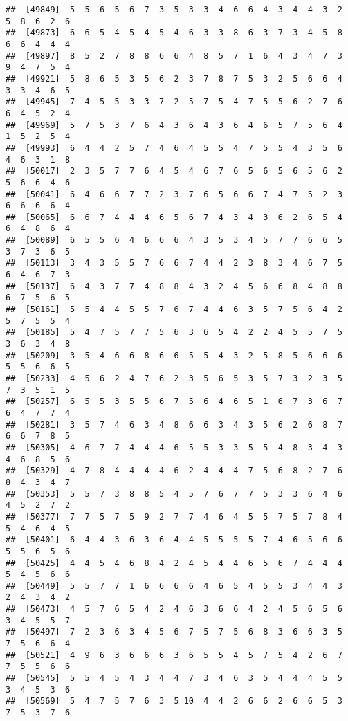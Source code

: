 \documentclass[
]{book}
\begin{document}
\begin{verbatim}
##  [49849]  5  5  6  5  6  7  3  5  3  3  4  6  6  4  3  4  4  3  2  5  8  6  2  6
##  [49873]  6  6  5  4  5  4  5  4  6  3  3  8  6  3  7  3  4  5  8  6  6  4  4  4
##  [49897]  8  5  2  7  8  8  6  6  4  8  5  7  1  6  4  3  4  7  3  9  4  7  5  4
##  [49921]  5  8  6  5  3  5  6  2  3  7  8  7  5  3  2  5  6  6  4  3  3  4  6  5
##  [49945]  7  4  5  5  3  3  7  2  5  7  5  4  7  5  5  6  2  7  6  6  4  5  2  4
##  [49969]  5  7  5  3  7  6  4  3  6  4  3  6  4  6  5  7  5  6  4  1  5  2  5  4
##  [49993]  6  4  4  2  5  7  4  6  4  5  5  4  7  5  5  4  3  5  6  4  6  3  1  8
##  [50017]  2  3  5  7  7  6  4  5  4  6  7  6  5  6  5  6  5  6  2  5  6  6  4  6
##  [50041]  6  4  6  6  7  7  2  3  7  6  5  6  6  7  4  7  5  2  3  6  6  6  6  4
##  [50065]  6  6  7  4  4  4  6  5  6  7  4  3  4  3  6  2  6  5  4  6  4  8  6  4
##  [50089]  6  5  5  6  4  6  6  6  4  3  5  3  4  5  7  7  6  6  5  3  7  3  6  5
##  [50113]  3  4  3  5  5  7  6  6  7  4  4  2  3  8  3  4  6  7  5  6  4  6  7  3
##  [50137]  6  4  3  7  7  4  8  8  4  3  2  4  5  6  6  8  4  8  8  6  7  5  6  5
##  [50161]  5  5  4  4  5  5  7  6  7  4  4  6  3  5  7  5  6  4  2  5  7  5  5  4
##  [50185]  5  4  7  5  7  7  5  6  3  6  5  4  2  2  4  5  5  7  5  3  6  3  4  8
##  [50209]  3  5  4  6  6  8  6  6  5  5  4  3  2  5  8  5  6  6  6  5  5  6  6  5
##  [50233]  4  5  6  2  4  7  6  2  3  5  6  5  3  5  7  3  2  3  5  7  3  5  1  5
##  [50257]  6  5  5  3  5  5  6  7  5  6  4  6  5  1  6  7  3  6  7  6  4  7  7  4
##  [50281]  3  5  7  4  6  3  4  8  6  6  3  4  3  5  6  2  6  8  7  6  6  7  8  5
##  [50305]  4  6  7  7  4  4  4  6  5  5  3  3  5  5  4  8  3  4  3  4  6  8  5  6
##  [50329]  4  7  8  4  4  4  4  6  2  4  4  4  7  5  6  8  2  7  6  8  4  3  4  7
##  [50353]  5  5  7  3  8  8  5  4  5  7  6  7  7  5  3  3  6  4  6  4  5  2  7  2
##  [50377]  7  7  5  7  5  9  2  7  7  4  6  4  5  5  7  5  7  8  4  5  4  6  4  5
##  [50401]  6  4  4  3  6  3  6  4  4  5  5  5  5  7  4  6  5  6  6  5  5  6  5  6
##  [50425]  4  4  5  4  6  8  4  2  4  5  4  4  6  5  6  7  4  4  4  5  4  5  6  6
##  [50449]  5  5  7  7  1  6  6  6  6  4  6  5  4  5  5  3  4  4  3  2  4  3  4  2
##  [50473]  4  5  7  6  5  4  2  4  6  3  6  6  4  2  4  5  6  5  6  3  4  5  5  7
##  [50497]  7  2  3  6  3  4  5  6  7  5  7  5  6  8  3  6  6  3  5  7  5  6  6  4
##  [50521]  4  9  6  3  6  6  6  3  6  5  5  4  5  7  5  4  2  6  7  7  5  5  6  6
##  [50545]  5  5  4  5  4  3  4  4  7  3  4  6  3  5  4  4  4  5  5  3  4  5  3  6
##  [50569]  5  4  7  5  7  6  3  5 10  4  4  2  6  6  2  6  6  5  3  7  5  3  7  6

\end{verbatim}
\end{document}
